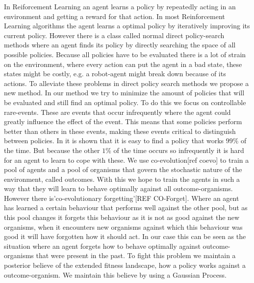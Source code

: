 In Reiforcement Learning an agent learns a policy by repeatedly acting in an environment and getting a reward for that action. In most Reinforcement Learning algorithms the agent learns a optimal policy by iteratively improving its current policy. However there is a class called normal direct policy-search methods where an agent finds its policy by directly searching the space of all possible policies. Because all policies have to be evaluated there is a lot of strain on the environment, where every action can put the agent in a bad state, these states might be costly, e.g. a robot-agent might break down because of its actions. To alleviate these problems in direct policy search methods we propose a new method. In our method we try to minimize the amount of policies that will be evaluated and still find an optimal policy. To do this we focus on controllable rare-events. These are events that occur infrequently where the agent could greatly influence the effect of the event. This means that some policies perform better than others in these events, making these events critical to distinguish between policies. In \cite{koppejan2011neuroevolutionary} it is shown that it is easy to find a policy that works $99\%$ of the time. But because the other $1\%$ of the time occurs so infrequently it is hard for an agent to learn to cope with these. 
We use co-evolution[ref coevo] to train a pool of agents and a pool of organisms that govern the stochastic nature of the environment, called outcomes. With this we hope to train the agents in such a way that they will learn to behave optimally against all outcome-organisms. However there is'co-evolutionary forgetting'[REF CO-Forget]. Where an agent has learned a certain behaviour that performs well against the other pool, but as this pool changes it forgets this behaviour as it is not as good against the new organisms, when it encounters new organisms against which this behaviour was good it will have forgotten how it should act. In our case this can be seen as the situation where an agent forgets how to behave optimally against outcome-organisms that were present in the past. To fight this problem we maintain a posterior believe of the extended fitness landscape, how a policy works against a outcome-organism. We maintain this believe by using a Gaussian Process.